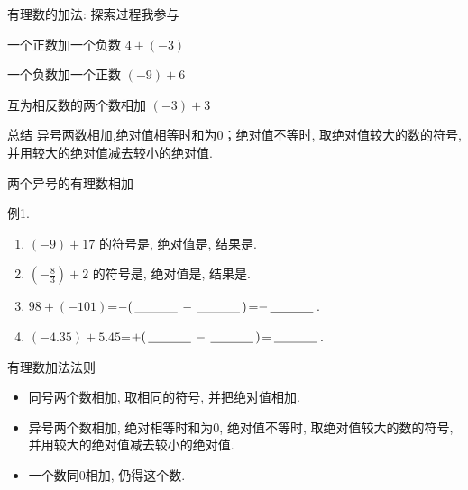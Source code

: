 \documentclass{beamer}
\begin{document}
\begin{frame}{有理数的加法: 探索过程我参与}
    \begin{block}{一个正数加一个负数}  \pause
     $4+(-3)$
  \end{block}  \pause
  \begin{block}{一个负数加一个正数} \pause
    $(-9)+6$
  \end{block}  \pause
  \begin{block}{互为相反数的两个数相加} \pause
     $(-3)+3$
  \end{block}  \pause
  \begin{alertblock}{总结}
    异号两数相加,绝对值相等时和为$0$；绝对值不等时, 取绝对值较大的数的符号, 并用较大的绝对值减去较小的绝对值.
  \end{alertblock}
\end{frame}

\begin{frame}{两个异号的有理数相加}  \pause
  \begin{exampleblock}{例1.}
    \begin{enumerate}[<+->]
      \item $(-9)+17$ 的符号是\lines, 绝对值是\lines, 结果是\lines.
      \item $(-\frac83)+2$ 的符号是\lines, 绝对值是\lines, 结果是\lines.
      \item $98+(-101)$=$-(\,\underline{\mbox{\hspace{1.2cm}}}\,-\,\underline{\mbox{\hspace{1.2cm}}}\,)$=$-\,\underline{\mbox{\hspace{1.2cm}}}\,$.
      \item $(-4.35)+5.45$=$+(\,\underline{\mbox{\hspace{1.2cm}}}\,-\,\underline{\mbox{\hspace{1.2cm}}}\,)$=$\,\underline{\mbox{\hspace{1.2cm}}}\,$.
    \end{enumerate}
  \end{exampleblock}
\end{frame}


\begin{frame}{有理数加法法则}
  \kaishu \displaygray
  \begin{block}{}
    \begin{itemize}
      \item<2->  同号两个数相加, 取相同的符号, 并把绝对值相加. %
      \item<3-> 异号两个数相加, 绝对相等时和为$0$, 绝对值不等时, 取绝对值较大的数的符号, 并用较大的绝对值减去较小的绝对值. %
      \item<4> 一个数同$0$相加, 仍得这个数. 
    \end{itemize}
  \end{block}
\end{frame}
\end{document}
